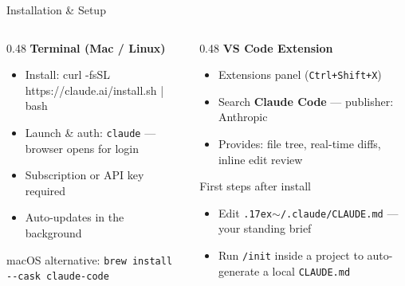 \documentclass[aspectratio=169, 10pt]{beamer}
\begin{document}
\begin{frame}{Installation \& Setup}
  \begin{columns}[T]
    \begin{column}{0.48\textwidth}
      \textbf{\color{biokteal}Terminal (Mac / Linux)}
      \begin{itemize}[label=\textbullet]\setlength\itemsep{4pt}
        \item \alert{Install:}
              {\small\ttfamily curl -fsSL https://claude.ai/install.sh | bash}
        \item \alert{Launch \& auth:} \texttt{claude} --- browser opens for login
        \item Subscription or API key required
        \item Auto-updates in the background
      \end{itemize}
      \vspace{0.3em}
      {\small macOS alternative: \texttt{brew install -{}-cask claude-code}}
    \end{column}
    \begin{column}{0.48\textwidth}
      \textbf{\color{biokteal}VS Code Extension}
      \begin{itemize}[label=\textbullet]\setlength\itemsep{4pt}
        \item Extensions panel (\texttt{Ctrl+Shift+X})
        \item Search \textbf{Claude Code} --- publisher: Anthropic
        \item Provides: file tree, real-time diffs, inline edit review
      \end{itemize}
      \vspace{0.5em}
      \begin{block}{First steps after install}
        \small
        \begin{itemize}[label=\textbullet]\setlength\itemsep{2pt}
          \item Edit \texttt{{\raise.17ex\hbox{$\scriptstyle\sim$}}/.claude/CLAUDE.md} --- your standing brief
          \item Run \texttt{/init} inside a project to auto-generate a local \texttt{CLAUDE.md}
        \end{itemize}
      \end{block}
    \end{column}
  \end{columns}
\end{frame}
\end{document}
